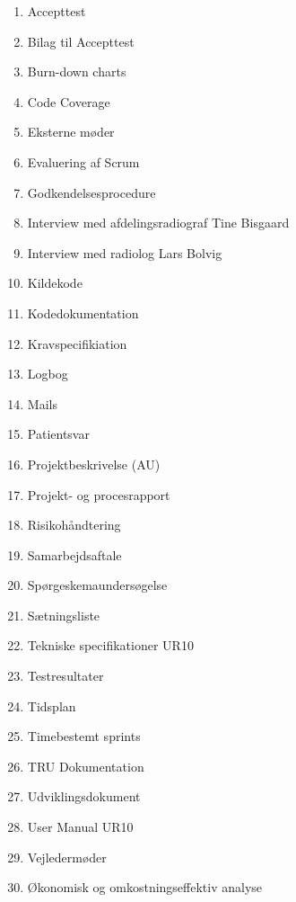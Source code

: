 \begin{enumerate}
\item Accepttest 					 		\label{Accepttest}
\item Bilag til Accepttest						\label{BilagAccepttest}
\item Burn-down charts						\label{BurnDown}
\item Code Coverage 						\label{Code Coverage}
\item Eksterne møder						\label{Eksterne moder} 
\item Evaluering af Scrum 						\label{Evaluering Scrum} 
\item Godkendelsesprocedure 					\label{Godkendelsesprocedure}
\item Interview med afdelingsradiograf Tine Bisgaard 	\label{Tine}
\item Interview med radiolog Lars Bolvig  			\label{Telefoninterview}
\item Kildekode							\label{Kildekode}
\item Kodedokumentation \label{Kodedokumentation} 
\item Kravspecifikiation 						\label{Kravspecifikation}
\item Logbog								\label{Logbog}
\item Mails								\label{Mails}
\item Patientsvar							\label{Patientsvar} 
\item Projektbeskrivelse (AU) 					\label{Projektbeskrivelse}
\item Projekt- og procesrapport 					\label{Projekt- og procesrapport}
\item Risikohåndtering 						\label{Risikohandtering} 
\item Samarbejdsaftale						\label{Samarbejdsaftale} 
\item Spørgeskemaundersøgelse 					\label{Sporgeskemaundersogelse}
\item Sætningsliste 							\label{Satningsliste}
\item Tekniske specifikationer UR10				\label{UR10spec}
\item Testresultater 						\label{TestResultater}
\item Tidsplan							\label{Tidsplan}
\item Timebestemt sprints 						\label{Timebestemt sprints}
\item TRU Dokumentation 						\label{TRUDokumentation}
\item Udviklingsdokument 						\label{Udviklingsdokument}
\item User Manual UR10 						\label{UserManualUR10}
\item Vejledermøder						\label{Vejledermoder}
\item Økonomisk og omkostningseffektiv analyse		\label{Okonomi}
\end{enumerate}

